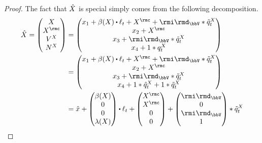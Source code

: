 \begin{proof}
  \label{proof:proposition:joint-characteristics}
  The fact that $\hat{X}$ is special simply comes from the following decomposition.
  \begin{align*}
    \hat\X 
    = \begin{pmatrix}
      \X \\ \X^\rmc \\ \V^\X \\ \N^\X 
    \end{pmatrix}  
    &= \begin{pmatrix} 
      \stateVar_1 + \affDrift(\X) \shortInt \leb_t + \X^\rmc + \id_\vecSpace \ast \compensate{\jumpMeas^\X}_t \\ \stateVar_2 + \X^\rmc \\ \stateVar_3 + \id_\vecSpace \ast \compensate{\jumpMeas^\X}_t  \\ \stateVar_4 + 1 \ast \jumpMeas^\X_t
    \end{pmatrix}  \\
    &= \begin{pmatrix} 
      \stateVar_1 + \affDrift(\X) \shortInt \leb_t + \X^\rmc + \id_\vecSpace \ast \compensate{\jumpMeas^\X}_t \\ \stateVar_2 + \X^\rmc \\ \stateVar_3 + \id_\vecSpace \ast \compensate{\jumpMeas^\X}_t  \\ \stateVar_4 + 1 \ast \predproj{\jumpMeas^\X}_t + 1 \ast \compensate{\jumpMeas^\X}_t
    \end{pmatrix}  \\
    &= \hat\stateVar 
    + \begin{pmatrix} 
      \affDrift(\X) \\
      0 \\
      0 \\
      \affInt(\X)
    \end{pmatrix} \shortInt \leb_t
    + \begin{pmatrix}
      \X^\rmc \\
      \X^\rmc \\
      0 \\
      0
    \end{pmatrix}
    + \begin{pmatrix}
      \id_\vecSpace \\
      0 \\
      \id_\vecSpace \\
      1 
    \end{pmatrix} \ast \compensate{\jumpMeas^\X}_t

\end{align*}
\end{proof}
